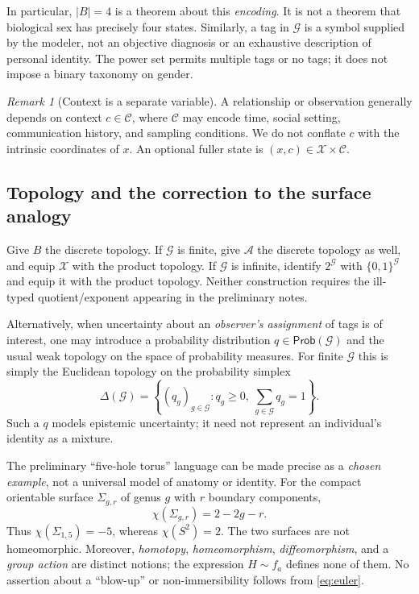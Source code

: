 \documentclass[11pt,a4paper]{article}
\numberwithin{equation}{section}
\theoremstyle{remark}
\newtheorem{remark}[definition]{Remark}
\newcommand{\ProbSpace}{\mathsf{Prob}}
\newcommand{\G}{\mathcal{G}}
\newcommand{\A}{\mathcal{A}}
\newcommand{\X}{\mathcal{X}}
\newcommand{\C}{\mathcal{C}}
\newcommand{\1}{\mathbf{1}}
\begin{document}
In particular, $|B|=4$ is a theorem about this \emph{encoding}.
It is not a theorem that biological sex has precisely four states.
Similarly, a tag in $\G$ is a symbol supplied by the modeler, not an
objective diagnosis or an exhaustive description of personal identity.
The power set permits multiple tags or no tags; it does not impose a
binary taxonomy on gender.

\begin{remark}[Context is a separate variable]
A relationship or observation generally depends on context $c\in\C$,
where $\C$ may encode time, social setting, communication history, and
sampling conditions.  We do not conflate $c$ with the intrinsic
coordinates of $x$.  An optional fuller state is $(x,c)\in\X\times\C$.
\end{remark}

\subsection{Topology and the correction to the surface analogy}
Give $B$ the discrete topology.  If $\G$ is finite, give $\A$ the
discrete topology as well, and equip $\X$ with the product topology.
If $\G$ is infinite, identify $2^{\G}$ with $\{0,1\}^{\G}$ and equip
it with the product topology.  Neither construction requires the
ill-typed quotient/exponent appearing in the preliminary notes.

Alternatively, when uncertainty about an \emph{observer's assignment}
of tags is of interest, one may introduce a probability distribution
$q\in\ProbSpace(\G)$ and the usual weak topology on the space of probability
measures.  For finite $\G$ this is simply the Euclidean topology on
the probability simplex
\begin{equation}
\Delta(\G)=\left\{(q_g)_{g\in\G}:q_g\ge0,
\ \sum_{g\in\G}q_g=1\right\}.
\end{equation}
Such a $q$ models epistemic uncertainty; it need not represent an
individual's identity as a mixture.

The preliminary ``five-hole torus'' language can be made precise as a
\emph{chosen example}, not a universal model of anatomy or identity.
For the compact orientable surface $\Sigma_{g,r}$ of genus $g$ with $r$
boundary components,
\begin{equation}\label{eq:euler}
\chi(\Sigma_{g,r})=2-2g-r.
\end{equation}
Thus $\chi(\Sigma_{1,5})=-5$, whereas $\chi(S^2)=2$.
The two surfaces are not homeomorphic.  Moreover, \emph{homotopy},
\emph{homeomorphism}, \emph{diffeomorphism}, and a \emph{group action}
are distinct notions; the expression $H\sim f_a$ defines none of them.
No assertion about a ``blow-up'' or non-immersibility follows from
\eqref{eq:euler}.
\end{document}
